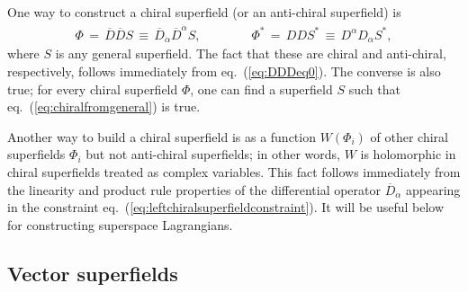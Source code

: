 \documentclass[11pt]{article}
\def\beq{\begin{eqnarray}}
\def\eeq{\end{eqnarray}}
\def\Dcon{\overline D}
\begin{document}
One way to construct a chiral superfield (or an anti-chiral superfield) is 
\beq
\Phi \,=\, 
\Dcon\Dcon S
\,\equiv\, 
\Dcon_{\dot\alpha} \Dcon^{\dot \alpha} S,
\qquad\qquad
\Phi^* \,=\, DDS^* \,\equiv\, D^\alpha D_\alpha S^*,
\label{eq:chiralfromgeneral}
\eeq 
where $S$ is any 
general superfield. The fact that these are chiral and anti-chiral, respectively, 
follows immediately from eq.~(\ref{eq:DDDeq0}).
The converse is also true; 
for every chiral superfield $\Phi$, one can find a superfield $S$ such that 
eq.~(\ref{eq:chiralfromgeneral}) is true. 

Another way to build a chiral superfield is as 
a function $W(\Phi_i)$ of other chiral superfields $\Phi_i$ 
but not anti-chiral superfields; in other words, $W$ is holomorphic in 
chiral superfields treated as complex variables. 
This fact follows immediately from 
the linearity and product rule properties of the differential operator 
$\Dcon_{\dot \alpha}$ appearing in the constraint 
eq.~(\ref{eq:leftchiralsuperfieldconstraint}). It will be useful below 
for constructing superspace Lagrangians.

\subsection{Vector superfields\label{subsec:vectorsuperfields}}
\setcounter{equation}{0}
\setcounter{footnote}{2}
\end{document}

